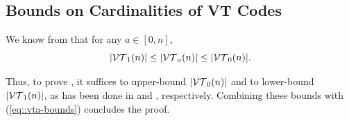 
\appendix

\subsection{Bounds on Cardinalities of VT Codes} \label{app::vt-upper-bound} \label{app::vta-lower}

We know from \cite[Corollary 2.3]{sloaneSingleDeletionCorrectingCodes2002} that for any $a \in [0,n]$,
\begin{equation}
    |\mathcal{VT}_{1}(n)| \leq |\mathcal{VT}_{a}(n)| \leq |\mathcal{VT}_{0}(n)|. \label{eq::vta-bounds}
\end{equation}

Thus, to prove , it suffices to upper-bound $|\mathcal{VT}_{0}(n)|$ and to lower-bound $|\mathcal{VT}_{1}(n)|$, as has been done in  and , respectively. Combining these bounds with (\ref{eq::vta-bounds}) concludes the proof.


